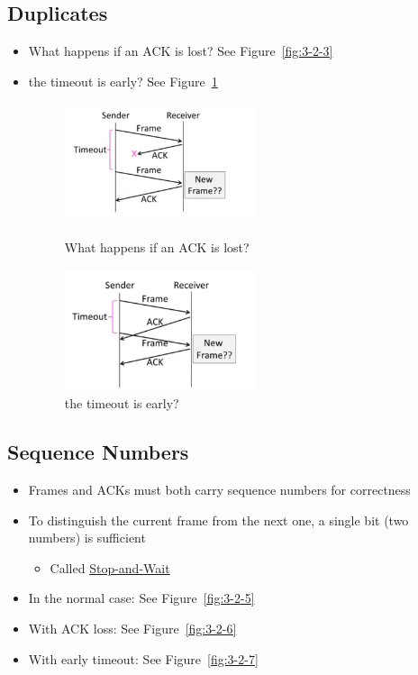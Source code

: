\documentclass[12pt]{ctexart}   %
\begin{document}
	\subsection{Duplicates}
	\begin{itemize}
		\item What happens if an ACK is lost? See Figure~\ref{fig:3-2-3}
		\item the timeout is early? See Figure~\ref{fig:3-2-4}
	
		\begin{figure}
			\begin{minipage}[t]{0.5\linewidth}
				\centering
				\includegraphics[width=2.2in]{images/3-2-3}
				\caption{What happens if an ACK is lost?}
				\label{fig:3-2-3}
			\end{minipage}
			\begin{minipage}[t]{0.5\linewidth}
				\centering
				\includegraphics[width=2.2in]{images/3-2-4}
				\caption{the timeout is early?}
				\label{fig:3-2-4}
			\end{minipage}
		\end{figure}
	\end{itemize}
	
	\subsection{Sequence Numbers}
	\begin{itemize}
		\item Frames and ACKs must both carry sequence numbers for correctness
		\item To distinguish the current frame from the next one, a single bit  (two numbers) is sufficient
		\begin{itemize}
			\item Called \underline{Stop-and-Wait}
		\end{itemize}
		
		\item In the normal case:  See Figure~\ref{fig:3-2-5}
		\item With ACK loss:  See Figure~\ref{fig:3-2-6}
		\item With early timeout:  See Figure~\ref{fig:3-2-7}
	\end{itemize}
	
\end{document}
